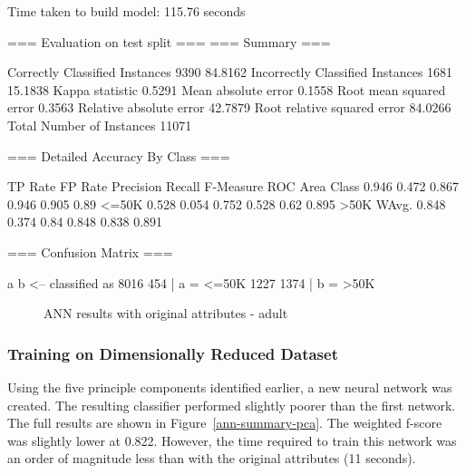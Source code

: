 \documentclass{sig-alternate}
\begin{document}
\tiny
\begin{verbbox}
Time taken to build model: 115.76 seconds

=== Evaluation on test split ===
=== Summary ===

Correctly Classified Instances        9390               84.8162 %
Incorrectly Classified Instances      1681               15.1838 %
Kappa statistic                          0.5291
Mean absolute error                      0.1558
Root mean squared error                  0.3563
Relative absolute error                 42.7879 %
Root relative squared error             84.0266 %
Total Number of Instances            11071     

=== Detailed Accuracy By Class ===

       TP Rate   FP Rate   Precision   Recall  F-Measure   ROC Area  Class
         0.946     0.472      0.867     0.946     0.905      0.89      <=50K
         0.528     0.054      0.752     0.528     0.62       0.895     >50K
WAvg.    0.848     0.374      0.84      0.848     0.838      0.891

=== Confusion Matrix ===

    a    b   <-- classified as
 8016  454 |    a =  <=50K
 1227 1374 |    b =  >50K
\end{verbbox}
\normalsize

\begin{figure}[!htbp]
    \centering
    \theverbbox
    \caption{ANN results with original attributes - adult\label{ann-summary-original}}
\end{figure}


\subsubsection{Training on Dimensionally Reduced Dataset}

Using the five principle components identified earlier, a new neural network was created. The resulting classifier performed slightly poorer than the first network. The full results are shown in Figure~\ref{ann-summary-pca}. The weighted f-score was slightly lower at 0.822. However, the time required to train this network was an order of magnitude less than with the original attributes (11 seconds).
\end{document}
